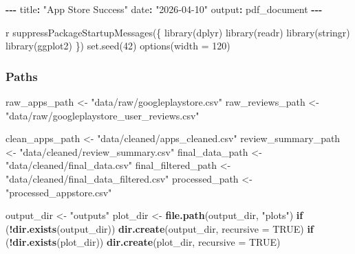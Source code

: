 \documentclass[
]{article}
\author{}
\date{\vspace{-2.5em}}
\newenvironment{Shaded}{\begin{snugshade}}{\end{snugshade}}
\newcommand{\AttributeTok}[1]{\textcolor[rgb]{0.13,0.29,0.53}{#1}}
\newcommand{\ConstantTok}[1]{\textcolor[rgb]{0.56,0.35,0.01}{#1}}
\newcommand{\ControlFlowTok}[1]{\textcolor[rgb]{0.13,0.29,0.53}{\textbf{#1}}}
\newcommand{\FunctionTok}[1]{\textcolor[rgb]{0.13,0.29,0.53}{\textbf{#1}}}
\newcommand{\NormalTok}[1]{#1}
\newcommand{\OtherTok}[1]{\textcolor[rgb]{0.56,0.35,0.01}{#1}}
\newcommand{\SpecialCharTok}[1]{\textcolor[rgb]{0.81,0.36,0.00}{\textbf{#1}}}
\newcommand{\StringTok}[1]{\textcolor[rgb]{0.31,0.60,0.02}{#1}}
\begin{document}
\begin{Shaded}
\begin{Highlighting}[]
\SpecialCharTok{{-}{-}{-}}
\NormalTok{title}\SpecialCharTok{:} \StringTok{"App Store Success"}
\NormalTok{date}\SpecialCharTok{:} \StringTok{"2026{-}04{-}10"}
\NormalTok{output}\SpecialCharTok{:}\NormalTok{ pdf\_document}
\SpecialCharTok{{-}{-}{-}}


\StringTok{\textasciigrave{}\textasciigrave{}\textasciigrave{}}\AttributeTok{ r}
\AttributeTok{suppressPackageStartupMessages(\{}
\AttributeTok{    library(dplyr)}
\AttributeTok{    library(readr)}
\AttributeTok{    library(stringr)}
\AttributeTok{    library(ggplot2)}
\AttributeTok{\})}
\AttributeTok{set.seed(42)}
\AttributeTok{options(width = 120)}
\end{Highlighting}
\end{Shaded}

\subsubsection{Paths}\label{paths}

\begin{Shaded}
\begin{Highlighting}[]
\NormalTok{raw\_apps\_path }\OtherTok{\textless{}{-}} \StringTok{"data/raw/googleplaystore.csv"}
\NormalTok{raw\_reviews\_path }\OtherTok{\textless{}{-}} \StringTok{"data/raw/googleplaystore\_user\_reviews.csv"}

\NormalTok{clean\_apps\_path }\OtherTok{\textless{}{-}} \StringTok{"data/cleaned/apps\_cleaned.csv"}
\NormalTok{review\_summary\_path }\OtherTok{\textless{}{-}} \StringTok{"data/cleaned/review\_summary.csv"}
\NormalTok{final\_data\_path }\OtherTok{\textless{}{-}} \StringTok{"data/cleaned/final\_data.csv"}
\NormalTok{final\_filtered\_path }\OtherTok{\textless{}{-}} \StringTok{"data/cleaned/final\_data\_filtered.csv"}
\NormalTok{processed\_path }\OtherTok{\textless{}{-}} \StringTok{"processed\_appstore.csv"}

\NormalTok{output\_dir }\OtherTok{\textless{}{-}} \StringTok{"outputs"}
\NormalTok{plot\_dir }\OtherTok{\textless{}{-}} \FunctionTok{file.path}\NormalTok{(output\_dir, }\StringTok{"plots"}\NormalTok{)}
\ControlFlowTok{if}\NormalTok{ (}\SpecialCharTok{!}\FunctionTok{dir.exists}\NormalTok{(output\_dir)) }\FunctionTok{dir.create}\NormalTok{(output\_dir, }\AttributeTok{recursive =} \ConstantTok{TRUE}\NormalTok{)}
\ControlFlowTok{if}\NormalTok{ (}\SpecialCharTok{!}\FunctionTok{dir.exists}\NormalTok{(plot\_dir)) }\FunctionTok{dir.create}\NormalTok{(plot\_dir, }\AttributeTok{recursive =} \ConstantTok{TRUE}\NormalTok{)}
\end{Highlighting}
\end{Shaded}
\end{document}
